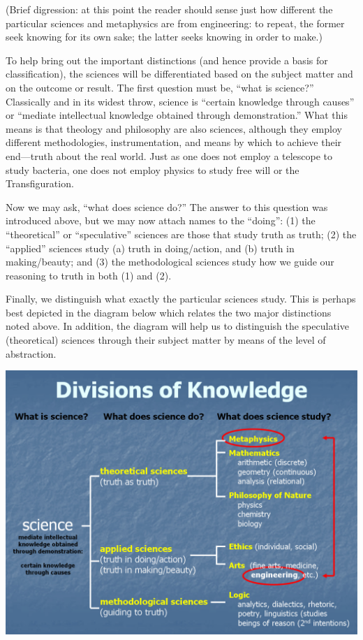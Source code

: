 (Brief digression: at this point the reader should sense just how different the particular sciences and metaphysics are from engineering: to repeat, the former seek knowing for its own sake; the latter seeks knowing in order to make.)

To help bring out the important distinctions (and hence provide a basis for classification), the sciences will be differentiated based on the subject matter and on the outcome or result. The first question must be, “what is science?” Classically and in its widest throw, science is “certain knowledge through causes” or “mediate intellectual knowledge obtained through demonstration.” What this means is that theology and philosophy are also sciences, although they employ different methodologies, instrumentation, and means by which to achieve their end—truth about the real world. Just as one does not employ a telescope to study bacteria, one does not employ physics to study free will or the Transfiguration.

Now we may ask, “what does science do?” The answer to this question was introduced above, but we may now attach names to the “doing”: (1) the “theoretical” or “speculative” sciences are those that study truth as truth; (2) the “applied” sciences study (a) truth in doing/action, and (b) truth in making/beauty; and (3) the methodological sciences study how we guide our reasoning to truth in both (1) and (2).

Finally, we distinguish what exactly the particular sciences study. This is perhaps best depicted in the diagram below which relates the two major distinctions noted above. In addition, the diagram will help us to distinguish the speculative (theoretical) sciences through their subject matter by means of the level of abstraction.

\begin{center}
\includegraphics[scale=0.6]{sich_science_taxonomy.jpg}
\end{center}

